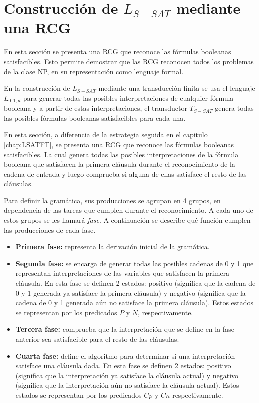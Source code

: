 \documentclass[12pt]{article}
\begin{document}
\section{Construcción de $L_{S-SAT}$ mediante una RCG}

En esta sección se presenta una RCG que reconoce las fórmulas booleanas satisfacibles. Esto permite demostrar 
que las RCG reconocen todos los problemas de la clase NP, en su representación como lenguaje formal.

En la construcción de $L_{S-SAT}$ mediante una transducción finita se usa el lenguaje $L_{0,1,d}$ para generar todas las posibles interpretaciones de cualquier fórmula booleana y a partir de estas interpretaciones, el transductor $T_{S-SAT}$ genera todas las posibles fórmulas booleanas satisfacibles para cada una. 

En esta sección, a diferencia de la estrategia seguida en el capitulo \ref{chap:LSATFT}, se presenta una RCG que reconoce las fórmulas booleanas satisfacibles. La cual genera todas las posibles interpretaciones de la fórmula booleana que satisfacen la primera cláusula durante el reconocimiento de la cadena de entrada y luego comprueba si alguna de ellas satisface el resto de las cláusulas.

Para definir la gramática, sus producciones se agrupan en 4 grupos, en dependencia de las tareas que cumplen durante el reconocimiento. A cada uno de estos grupos se les llamará \textit{fase}. A continuación se describe qué función cumplen las producciones de cada fase.

\begin{itemize}
    \item \textbf{Primera fase:} representa la derivación inicial de la gramática.
    \item \textbf{Segunda fase:} se encarga de generar todas las posibles cadenas de 0 y 1 que representan interpretaciones de las variables que satisfacen la primera cláusula. En esta fase se definen 2 estados: positivo (significa que la cadena de 0 y 1 generada ya satisface la primera cláusula) y negativo (significa que la cadena de 0 y 1 generada aún no satisface la primera cláusula). Estos estados se representan por los predicados $P$ y $N$, respectivamente.
    \item \textbf{Tercera fase:} comprueba que la interpretación que se define en la fase anterior sea satisfacible para el resto de las cláusulas.
    \item \textbf{Cuarta fase:} define el algoritmo para determinar si una interpretación satisface una cláusula dada. En esta fase se definen 2 estados: positivo (significa que la interpretación ya satisface la cláusula actual) y negativo (significa que la interpretación aún no satisface la cláusula actual). Estos estados se representan por los predicados $Cp$ y $Cn$ respectivamente.
\end{itemize}
\end{document}
